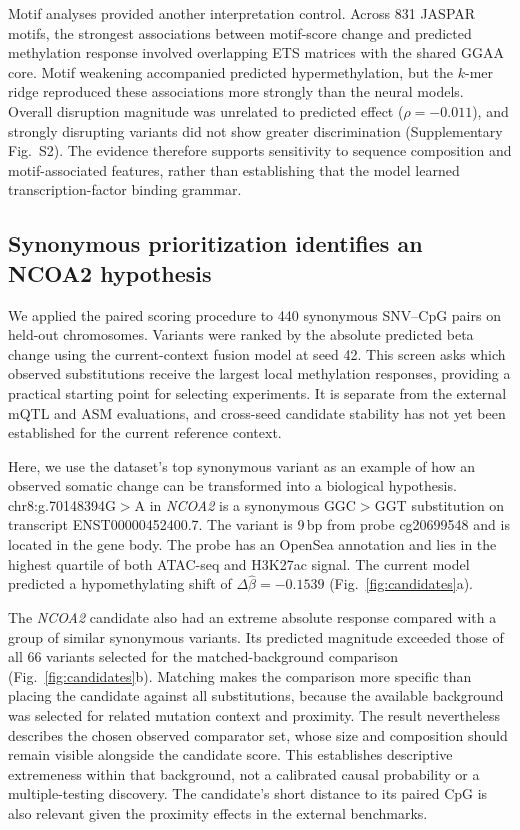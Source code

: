 \documentclass[11pt,letterpaper,twocolumn]{article}
\begin{document}
Motif analyses provided another interpretation control. Across 831 JASPAR motifs, the strongest associations between motif-score change and predicted methylation response involved overlapping ETS matrices with the shared GGAA core. Motif weakening accompanied predicted hypermethylation, but the $k$-mer ridge reproduced these associations more strongly than the neural models. Overall disruption magnitude was unrelated to predicted effect ($\rho=-0.011$), and strongly disrupting variants did not show greater discrimination (Supplementary Fig.~S2). The evidence therefore supports sensitivity to sequence composition and motif-associated features, rather than establishing that the model learned transcription-factor binding grammar.

\subsection{Synonymous prioritization identifies an NCOA2 hypothesis}
We applied the paired scoring procedure to 440 synonymous SNV--CpG pairs on held-out chromosomes. Variants were ranked by the absolute predicted beta change using the current-context fusion model at seed 42. This screen asks which observed substitutions receive the largest local methylation responses, providing a practical starting point for selecting experiments. It is separate from the external mQTL and ASM evaluations, and cross-seed candidate stability has not yet been established for the current reference context.

Here, we use the dataset's top synonymous variant as an example of how an observed somatic change can be transformed into a biological hypothesis. chr8:g.70148394G$>$A in \textit{NCOA2} is a synonymous GGC$>$GGT substitution on transcript ENST00000452400.7. The variant is 9\,bp from probe cg20699548 and is located in the gene body. The probe has an OpenSea annotation and lies in the highest quartile of both ATAC-seq and H3K27ac signal. The current model predicted a hypomethylating shift of $\Delta\widehat\beta=-0.1539$ (Fig.~\ref{fig:candidates}a).

The \textit{NCOA2} candidate also had an extreme absolute response compared with a group of similar synonymous variants. Its predicted magnitude exceeded those of all 66 variants selected for the matched-background comparison (Fig.~\ref{fig:candidates}b). Matching makes the comparison more specific than placing the candidate against all substitutions, because the available background was selected for related mutation context and proximity. The result nevertheless describes the chosen observed comparator set, whose size and composition should remain visible alongside the candidate score. This establishes descriptive extremeness within that background, not a calibrated causal probability or a multiple-testing discovery. The candidate's short distance to its paired CpG is also relevant given the proximity effects in the external benchmarks.
\end{document}
